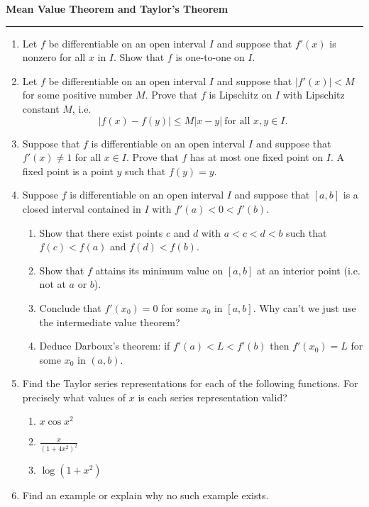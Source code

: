 \documentclass[12pt]{article}
\begin{document}
\begin{center}
{\bf \Large Mean Value Theorem and Taylor's Theorem}
\vspace{0.2cm}
\hrule
\end{center}

\begin{enumerate}
	\item Let $f$ be differentiable on an open interval $I$ and suppose that $f'(x)$ is nonzero for all $x$ in $I$. Show that $f$ is one-to-one on $I$.
	\vfill
	\item Let $f$ be differentiable on an open interval $I$ and suppose that $|f'(x)| <M$ for some positive number $M$. Prove that $f$ is Lipschitz on $I$ with Lipschitz constant $M$, i.e.
	$$|f(x)-f(y)|\leq M|x-y|\ \text{for all } x,y\in I.$$
	\vfill
	\item Suppose that $f$ is differentiable on an open interval $I$ and suppose that $f'(x) \neq 1$ for all $x\in I$. Prove that $f$ has at most one fixed point on $I$. A fixed point is a point $y$ such that $f(y) = y$.
	\vfill
	\item Suppose $f$ is differentiable on an open interval $I$ and suppose that $[a,b]$ is a closed interval contained in $I$ with $f'(a)<0<f'(b)$.
	\begin{enumerate}
		\item Show that there exist points $c$ and $d$ with $a<c<d<b$ such that $f(c)<f(a)$ and $f(d)<f(b)$.
		\vfill
		\item Show that $f$ attains its minimum value on $[a,b]$ at an interior point (i.e. not at $a$ or $b$).
		\vfill
		\item Conclude that $f'(x_0) = 0$ for some $x_0$ in $[a,b]$. Why can't we just use the intermediate value theorem?
		\vfill
		\item Deduce Darboux's theorem: if $f'(a)<L<f'(b)$ then $f'(x_0) = L$ for some $x_0$ in $(a,b)$.
		\vfill
		\null
	\end{enumerate}
	\pagebreak
	\item Find the Taylor series representations for each of the following functions. For precisely what values of $x$ is each series representation valid?
	\begin{enumerate}
		\item $x\cos x^2$
		\vfill
		\item $\frac{x}{(1+4x^2)^2}$
		\vfill
		\item $\log(1+x^2)$
		\vfill
	\end{enumerate}
	\item Find an example or explain why no such example exists.

\end{enumerate}
\end{document}

